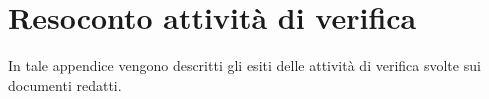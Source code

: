 \section{Resoconto attività di verifica}
In tale appendice vengono descritti gli esiti delle attività di verifica svolte sui documenti redatti.



